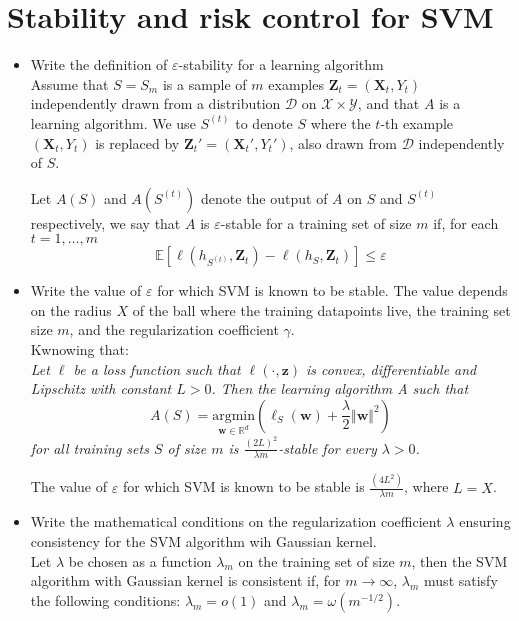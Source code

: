 \newpage
\section{Stability and risk control for SVM}

\begin{itemize}
    
    \item Write the definition of $\varepsilon$-stability for a learning algorithm\\

        Assume that $S = S_m$ is a sample of $m$ examples $\boldsymbol{Z}_t = (\boldsymbol{X}_t, Y_t)$ independently drawn from a distribution $\mathcal{D}$ on $\mathcal{X} \times \mathcal{Y}$, and that $A$ is a learning algorithm. We use $S^{(t)}$ to denote $S$ where the $t$-th example $(\boldsymbol{X}_t, Y_t)$ is replaced by $\boldsymbol{Z}_t' = (\boldsymbol{X}_t', Y_t')$, also drawn from $\mathcal{D}$ independently of $S$.
        
        Let $A(S)$ and $A(S^{(t)})$ denote the output of $A$ on $S$ and $S^{(t)}$ respectively, we say that $A$ is $\varepsilon$-stable for a training set of size $m$ if, for each $t = 1, \dots, m$
        \begin{equation}
            \mathbb{E}\left[\ell(h_{S^{(t)}}, \boldsymbol{Z}_t) - \ell(h_{S}, \boldsymbol{Z}_t)\right] \leq \varepsilon
        \end{equation}

    \item Write the value of $\varepsilon$ for which SVM is known to be stable. The value depends on the radius $X$ of the ball where the training datapoints live, the training set size $m$, and the regularization coefficient $\gamma$.\\
       
        Kwnowing that:\\ 
        \textit{Let $\ell$ be a loss function such that $\ell(\cdot, \boldsymbol{z})$ is convex, differentiable and Lipschitz with constant $L > 0$. Then the learning algorithm A such that}
        $$
        A(S) = \underset{\boldsymbol{w} \in \mathbb{R}^d}{\text{argmin}} \left( \ell_S(\boldsymbol{w}) + \frac{\lambda}{2} \Vert \boldsymbol{w} \Vert^2 \right)
        $$
    \textit{for all training sets $S$ of size $m$ is $\frac{(2L)^2}{\lambda m}$-stable for every $\lambda > 0$.}

        The value of $\varepsilon$ for which SVM is known to be stable is $\frac{(4L^2)}{\lambda m}$, where $L = X$.\\       

    \item Write the mathematical conditions on the regularization coefficient $\lambda$ ensuring consistency for the SVM algorithm wih Gaussian kernel.\\

       Let $\lambda$ be chosen as a function $\lambda_m$ on the training set of size $m$, then the SVM algorithm with Gaussian kernel is consistent if, for $m \rightarrow \infty$, $\lambda_m$ must satisfy the following conditions: $\lambda_m = o(1)$ and $\lambda_m = \omega (m^{-1/2})$.

\end{itemize}
